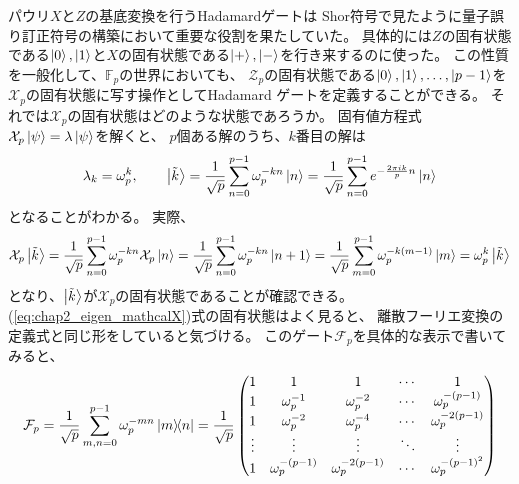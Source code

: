 \documentclass[../master.tex]{subfiles}
\begin{document}
パウリ$X$と$Z$の基底変換を行うHadamardゲートは
Shor符号で見たように量子誤り訂正符号の構築において重要な役割を果たしていた。
具体的には$Z$の固有状態である$\ket{0},\ket{1}$と$X$の固有状態である$\ket{+},\ket{-}$を行き来するのに使った。
この性質を一般化して、$\mathbb{F}_p$の世界においても、
$\mathcal{Z}_p$の固有状態である$\ket{0},\ket{1},\ldots,\ket{p-1}$を$\mathcal{X}_p$の固有状態に写す操作としてHadamard ゲートを定義することができる。
それでは$\mathcal{X}_p$の固有状態はどのような状態であろうか。
固有値方程式 $\mathcal{X}_p\ket{\psi} = \lambda \ket{\psi}$を解くと、
$p$個ある解のうち、$k$番目の解は
\begin{equation}\begin{aligned}[b]
    \lambda_k = \omega_p^k, \qquad
    \ket{\tilde{k}} = \frac{1}{\sqrt{p}}\sum_{n=0}^{p-1} \omega_p^{-kn} \ket{n}
    = \frac{1}{\sqrt{p}}\sum_{n=0}^{p-1} e^{-\frac{2\pi i k}{p}n} \ket{n}
    \label{eq:chap2_eigen_mathcalX}
\end{aligned}\end{equation}
となることがわかる。
実際、
\begin{equation}\begin{aligned}[b]
    \mathcal{X}_p \ket{\tilde{k}}
    = \frac{1}{\sqrt{p}}\sum_{n=0}^{p-1} \omega_p^{-kn} \mathcal{X}_p\ket{n}
    = \frac{1}{\sqrt{p}}\sum_{n=0}^{p-1} \omega_p^{-kn} \ket{n+1}
    = \frac{1}{\sqrt{p}}\sum_{m=0}^{p-1} \omega_p^{-k(m-1)} \ket{m} = \omega_p^k \ket{\tilde{k}}
\end{aligned}\end{equation}
となり、$\ket{\tilde{k}}$が$\mathcal{X}_p$の固有状態であることが確認できる。
(\ref{eq:chap2_eigen_mathcalX})式の固有状態はよく見ると、
離散フーリエ変換の定義式と同じ形をしていると気づける。
このゲート$\mathcal{F}_p$を具体的な表示で書いてみると、
\begin{equation}\begin{aligned}[b]
    \mathcal{F}_p
    =\frac{1}{\sqrt{p}}\sum_{m,n=0}^{p-1}\omega_p^{-mn}\ketbra{m}{n}
    = \frac{1}{\sqrt{p}}\begin{pmatrix}
        1 & 1 & 1 & \cdots & 1 \\
        1 & \omega_p^{-1} & \omega_p^{-2} & \cdots & \omega_p^{-(p-1)} \\
        1 & \omega_p^{-2} & \omega_p^{-4} & \cdots & \omega_p^{-2(p-1)} \\
        \vdots & \vdots & \vdots & \ddots & \vdots \\
        1 & \omega_p^{-(p-1)} & \omega_p^{-2(p-1)} & \cdots & \omega_p^{-(p-1)^2}
    \end{pmatrix}
\end{aligned}\end{equation}
\end{document}
